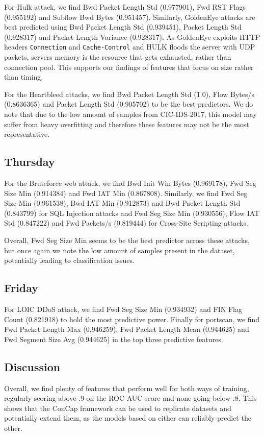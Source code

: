 \documentclass[conference]{IEEEtran}
\begin{document}
	For Hulk attack, we find Bwd Packet Length Std (0.977901), Fwd RST Flags (0.955192) and Subflow Bwd Bytes (0.951457). Similarly, GoldenEye attacks are best predicted using Bwd Packet Length Std (0.939451), Packet Length Std (0.928317) and Packet Length Variance (0.928317). As GoldenEye exploits HTTP headers \texttt{Connection} and \texttt{Cache-Control} and HULK floods the server with UDP packets, servers memory is the resource that gets exhausted, rather than connection pool. This supports our findings of features that focus on size rather than timing.
	
	For the Heartbleed attacks, we find Bwd Packet Length Std (1.0), Flow Bytes/s (0.8636365) and Packet Length Std (0.905702) to be the best predictors. We do note that due to the low amount of samples from CIC-IDS-2017, this model may suffer from heavy overfitting and therefore these features may not be the most representative.
	
	\subsection{Thursday}
	For the Bruteforce web attack, we find Bwd Init Win Bytes (0.969178), Fwd Seg Size Min (0.914384) and Fwd IAT Min (0.867808). Similarly, we find Fwd Seg Size Min (0.961538), Bwd IAT Min (0.912873) and Bwd Packet Length Std (0.843799) for SQL Injection attacks and Fwd Seg Size Min (0.930556), Flow IAT Std (0.847222) and Fwd Packets/s (0.819444) for Cross-Site Scripting attacks. 
	
	Overall, Fwd Seg Size Min seems to be the best predictor across these attacks, but once again we note the low amount of samples present in the dataset, potentially leading to classification issues.
	
	\subsection{Friday}
	For LOIC DDoS attack, we find Fwd Seg Size Min (0.934932) and FIN Flag Count (0.821918) to hold the most predictive power. Finally for portscan, we find Fwd Packet Length Max (0.946259), Fwd Packet Length Mean (0.944625) and Fwd Segment Size Avg (0.944625) in the top three predictive features. 
	
	
	\subsection{Discussion}
	
	Overall, we find plenty of features that perform well for both ways of training, regularly scoring above .9 on the ROC AUC score and none going below .8. This shows that the ConCap framework can be used to replicate datasets and potentially extend them, as the models based on either can reliably predict the other.
	
\end{document}
